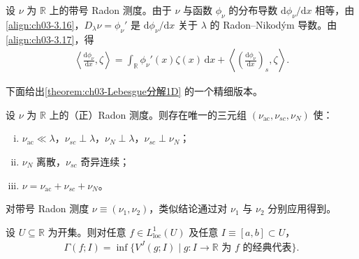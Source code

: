 \documentclass[../../main.tex]{subfiles}%
\begin{document}
\begin{remark}\label{remark:ch03-分布导数分解}
设 $\nu$ 为 $\mathbb{R}$ 上的带号 Radon 测度。由于 $\nu$ 与函数 $\phi_\nu$ 的分布导数 $\mathrm{d}\phi_\nu/\mathrm{d}x$ 相等，由\eqref{align:ch03-3.16}，$D_\lambda\nu=\phi_\nu'$ 是 $\mathrm{d}\phi_\nu/\mathrm{d}x$ 关于 $\lambda$ 的 Radon--Nikod\'ym 导数。由\eqref{align:ch03-3.17}，得
\begin{align*}
\left\langle\frac{\mathrm{d}\phi_\nu}{\mathrm{d}x},\zeta\right\rangle
=\int_{\mathbb{R}}\phi_\nu'(x)\zeta(x)\,\mathrm{d}x
+\left\langle\left(\frac{\mathrm{d}\phi_\nu}{\mathrm{d}x}\right)_s,\zeta\right\rangle.
\end{align*}
\end{remark}

下面给出\cref{theorem:ch03-Lebesgue分解1D} 的一个精细版本。

\begin{theorem}\label{theorem:ch03-三分分解}
设 $\nu$ 为 $\mathbb{R}$ 上的（正）Radon 测度。则存在唯一的三元组 $(\nu_{\mathrm{ac}},\nu_{sc},\nu_N)$ 使：
\begin{enumerate}[(i)]
\item $\nu_{\mathrm{ac}}\ll\lambda$，$\nu_{sc}\perp\lambda$，$\nu_N\perp\lambda$，$\nu_{sc}\perp\nu_N$；
\item $\nu_N$ 离散，$\nu_{sc}$ 奇异连续；
\item $\nu=\nu_{\mathrm{ac}}+\nu_{sc}+\nu_N$。
\end{enumerate}
对带号 Radon 测度 $\nu\equiv(\nu_1,\nu_2)$，类似结论通过对 $\nu_1$ 与 $\nu_2$ 分别应用得到。
\end{theorem}

\begin{proposition}\label{proposition:ch03-变差比较}
设 $U\subseteq\mathbb{R}$ 为开集。则对任意 $f\in L^1_{\mathrm{loc}}(U)$ 及任意 $I\equiv[a,b]\subset U$，
\begin{align}
\Gamma(f;I)=\inf\{V^J(g;I)\mid g:I\to\mathbb{R}\text{ 为 }f\text{ 的经典代表}\}.\label{align:ch03-3.18}
\end{align}
\end{proposition}
\end{document}
